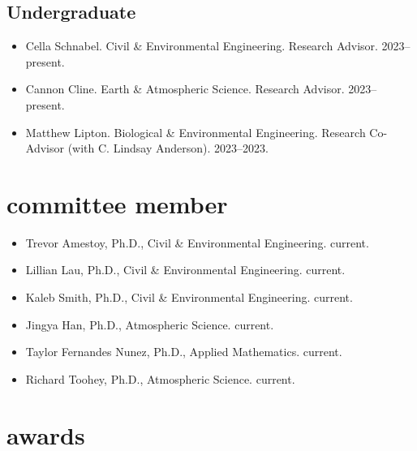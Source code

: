 \documentclass[11pt,article,oneside]{memoir}
\begin{document}
\subsection{Undergraduate}
\begin{itemize}[label={}]


\item Cella Schnabel. Civil \& Environmental Engineering. Research Advisor. 2023--present.  

\item Cannon Cline. Earth \& Atmospheric Science. Research Advisor. 2023--present.  

\item Matthew Lipton. Biological \& Environmental Engineering. Research Co-Advisor (with C. Lindsay Anderson). 2023--2023.  


\end{itemize}



\section{committee member}

\mbox{}\vspace{-\dimexpr\baselineskip\relax}

\vspace{\baselineskip}
\begin{itemize}[label={}]

\item Trevor Amestoy, Ph.D., Civil \& Environmental Engineering. current.

\item Lillian Lau, Ph.D., Civil \& Environmental Engineering. current.

\item Kaleb Smith, Ph.D., Civil \& Environmental Engineering. current.

\item Jingya Han, Ph.D., Atmospheric Science. current.

\item Taylor Fernandes Nunez, Ph.D., Applied Mathematics. current.

\item Richard Toohey, Ph.D., Atmospheric Science. current.

\end{itemize}



\section{awards}
\end{document}
